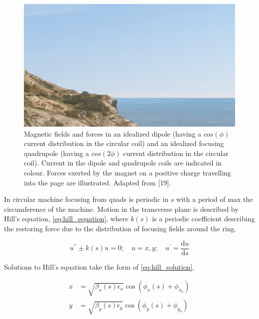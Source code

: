 \begin{figure}[!htb]
    \begin{center}
    \includegraphics[width = 0.9\linewidth]{Figures/placeholder.png}
    \caption{Magnetic fields and forces in an idealized dipole (having a $cos(\phi)$ current distribution in the circular coil) and an idealized focusing quadrupole (having a $cos(2\phi)$ current distribution in the circular coil). Current in the dipole and quadrupole coils are indicated in colour. Forces exerted by the magnet on a positive charge travelling into the page are illustrated. Adapted from [19].}
    \label{figure:dipole_quadrupole_fields}
    \end{center}
\end{figure}

In circular machine focusing from quads is periodic in $s$ with a period of max the circumference of the machine.
Motion in the transverse plane is described by Hill’s equation, \cref{eq:hill_equation}, where $k(s)$ is a periodic coefficient describing the restoring force due to the distribution of focusing fields around the ring.
\bigbreak

\begin{equation}
    u^{\prime \prime} \pm k(s) u = 0; \quad u = x, y; \quad u^{\prime} = \frac{\mathrm{d}u}{\mathrm{d}s}
    \label{eq:hill_equation}
\end{equation}
\bigbreak

Solutions to Hill’s equation take the form of \cref{eq:hill_solution},
\bigbreak

\begin{equation}
    \begin{aligned}
    x &= \sqrt{\beta_{x}(s) \epsilon_{x}} \cos \left(\phi_{x}(s) + \phi_{x_0}\right) \\
    y &= \sqrt{\beta_{y}(s) \epsilon_{y}} \cos \left(\phi_{y}(s) + \phi_{y_0}\right)
    \end{aligned}
    \label{eq:hill_solution}
\end{equation}

